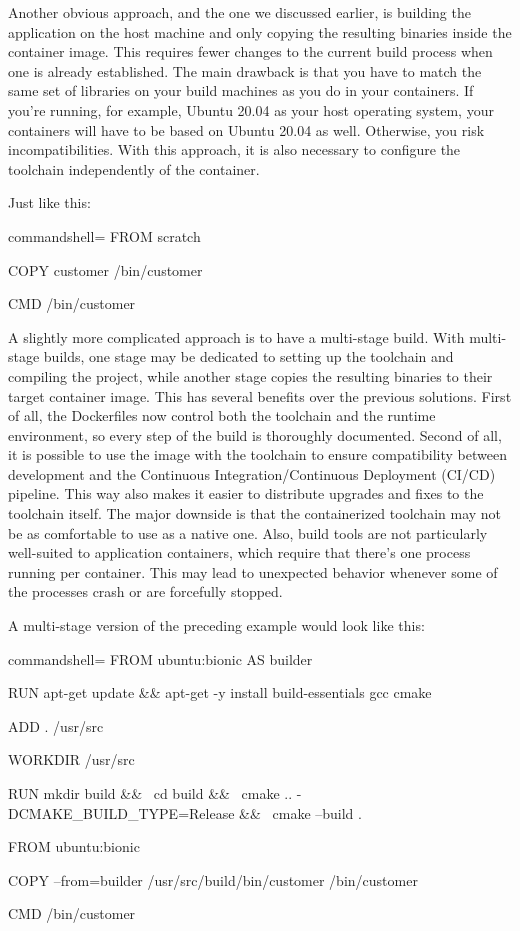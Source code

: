 Another obvious approach, and the one we discussed earlier, is building the application on the host machine and only copying the resulting binaries inside the container image. This requires fewer changes to the current build process when one is already established. The main drawback is that you have to match the same set of libraries on your build machines as you do in your containers. If you're running, for example, Ubuntu 20.04 as your host operating system, your containers will have to be based on Ubuntu 20.04 as well. Otherwise, you risk incompatibilities. With this approach, it is also necessary to configure the toolchain independently of the container.

Just like this:

\begin{tcblisting}{commandshell={}}
FROM scratch

COPY customer /bin/customer

CMD /bin/customer
\end{tcblisting}

A slightly more complicated approach is to have a multi-stage build. With multi-stage builds, one stage may be dedicated to setting up the toolchain and compiling the project, while another stage copies the resulting binaries to their target container image. This has several benefits over the previous solutions. First of all, the Dockerfiles now control both the toolchain and the runtime environment, so every step of the build is thoroughly documented. Second of all, it is possible to use the image with the toolchain to ensure compatibility between development and the Continuous Integration/Continuous Deployment (CI/CD) pipeline. This way also makes it easier to distribute upgrades and fixes to the toolchain itself. The major downside is that the containerized toolchain may not be as comfortable to use as a native one. Also, build tools are not particularly well-suited to application containers, which require that there's one process running per container. This may lead to unexpected behavior whenever some of the processes crash or are forcefully stopped.

A multi-stage version of the preceding example would look like this:

\begin{tcblisting}{commandshell={}}
FROM ubuntu:bionic AS builder

RUN apt-get update && apt-get -y install build-essentials gcc cmake

ADD . /usr/src

WORKDIR /usr/src

RUN mkdir build && \
    cd build && \
    cmake .. -DCMAKE_BUILD_TYPE=Release && \
    cmake --build .
    
FROM ubuntu:bionic

COPY --from=builder /usr/src/build/bin/customer /bin/customer

CMD /bin/customer
\end{tcblisting}

